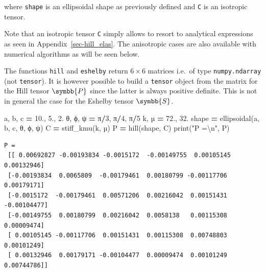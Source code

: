 \documentclass[
  a4paper,
  numbers=noendperiod,
  DIV=12]{scrreprt}
\newenvironment{Shaded}{\begin{snugshade}}{\end{snugshade}}
\newcommand{\BuiltInTok}[1]{#1}
\newcommand{\CharTok}[1]{\textcolor[rgb]{0.31,0.60,0.02}{#1}}
\newcommand{\DecValTok}[1]{\textcolor[rgb]{0.00,0.00,0.81}{#1}}
\newcommand{\FloatTok}[1]{\textcolor[rgb]{0.00,0.00,0.81}{#1}}
\newcommand{\NormalTok}[1]{#1}
\newcommand{\OperatorTok}[1]{\textcolor[rgb]{0.81,0.36,0.00}{\textbf{#1}}}
\newcommand{\StringTok}[1]{\textcolor[rgb]{0.31,0.60,0.02}{#1}}
\newcommand{\uuuu}[1]{{\symbb{{#1}}}}
\begin{document}
where \texttt{shape} is an ellipsoidal shape as previously defined and
\texttt{C} is an isotropic tensor.

Note that an isotropic tensor \texttt{C} simply allows to resort to
analytical expressions as seen in Appendix~\ref{sec-hill_elas}. The
anisotropic cases are also available with numerical algorithms as will
be seen below.

\begin{tcolorbox}[enhanced jigsaw, arc=.35mm, bottomrule=.15mm, bottomtitle=1mm, breakable, colback=white, colbacktitle=quarto-callout-warning-color!10!white, colframe=quarto-callout-warning-color-frame, coltitle=black, left=2mm, leftrule=.75mm, opacityback=0, opacitybacktitle=0.6, rightrule=.15mm, title=\textcolor{quarto-callout-warning-color}{\faExclamationTriangle}\hspace{0.5em}{Warning}, titlerule=0mm, toprule=.15mm, toptitle=1mm]

The functions \texttt{hill} and \texttt{eshelby} return \(6×6\) matrices
i.e.~of type \texttt{numpy.ndarray} (not \texttt{tensor}). It is however
possible to build a \texttt{tensor} object from the matrix for the Hill
tensor \(\uuuu{P}\) since the latter is always positive definite. This
is not in general the case for the Eshelby tensor \(\uuuu{S}\).

\end{tcolorbox}

\begin{Shaded}
\begin{Highlighting}[]
\NormalTok{a, b, c }\OperatorTok{=} \FloatTok{10.}\NormalTok{, }\FloatTok{5.}\NormalTok{, }\FloatTok{2.}
\NormalTok{θ, ϕ, ψ }\OperatorTok{=}\NormalTok{ π}\OperatorTok{/}\DecValTok{3}\NormalTok{, π}\OperatorTok{/}\DecValTok{4}\NormalTok{, π}\OperatorTok{/}\DecValTok{5}
\NormalTok{k, µ }\OperatorTok{=} \FloatTok{72.}\NormalTok{, }\FloatTok{32.} 
\NormalTok{shape }\OperatorTok{=}\NormalTok{ ellipsoidal(a, b, c, θ, ϕ, ψ)}
\NormalTok{C }\OperatorTok{=}\NormalTok{ stiff\_kmu(k, µ)}
\NormalTok{P }\OperatorTok{=}\NormalTok{ hill(shape, C)}
\BuiltInTok{print}\NormalTok{(}\StringTok{"P =}\CharTok{\textbackslash{}n}\StringTok{"}\NormalTok{, P)}
\end{Highlighting}
\end{Shaded}

\begin{verbatim}
P =
 [[ 0.00692827 -0.00193834 -0.0015172  -0.00149755  0.00105145  0.00132946]
 [-0.00193834  0.0065809  -0.00179461  0.00180799 -0.00117706  0.00179171]
 [-0.0015172  -0.00179461  0.00571206  0.00216042  0.00151431 -0.00104477]
 [-0.00149755  0.00180799  0.00216042  0.0058138   0.00115308  0.00009474]
 [ 0.00105145 -0.00117706  0.00151431  0.00115308  0.00748803  0.00101249]
 [ 0.00132946  0.00179171 -0.00104477  0.00009474  0.00101249  0.00744786]]
\end{verbatim}
\end{document}
